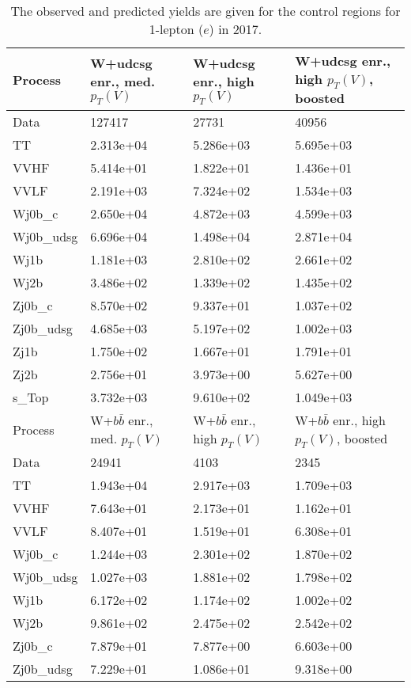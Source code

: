 \begin{table}
\centering
\caption[2017 1-lepton ($e$) control region yields]{
                  The observed and predicted yields are given for the
                  control regions for 1-lepton ($e$) in 2017.
                  }
{\footnotesize
\begin{tabularx}{0.8\textwidth}{|X|X|X|X|}
\hline
Process & W+udcsg enr., med. $p_{T}(V)$ & W+udcsg enr., high $p_{T}(V)$ & W+udcsg enr., high $p_{T}(V)$, boosted \\
\hline
Data & 127417 & 27731 & 40956 \\
\hline
TT & 2.313e+04 & 5.286e+03 & 5.695e+03 \\
VVHF & 5.414e+01 & 1.822e+01 & 1.436e+01 \\
VVLF & 2.191e+03 & 7.324e+02 & 1.534e+03 \\
Wj0b\_c & 2.650e+04 & 4.872e+03 & 4.599e+03 \\
Wj0b\_udsg & 6.696e+04 & 1.498e+04 & 2.871e+04 \\
Wj1b & 1.181e+03 & 2.810e+02 & 2.661e+02 \\
Wj2b & 3.486e+02 & 1.339e+02 & 1.435e+02 \\
Zj0b\_c & 8.570e+02 & 9.337e+01 & 1.037e+02 \\
Zj0b\_udsg & 4.685e+03 & 5.197e+02 & 1.002e+03 \\
Zj1b & 1.750e+02 & 1.667e+01 & 1.791e+01 \\
Zj2b & 2.756e+01 & 3.973e+00 & 5.627e+00 \\
s\_Top & 3.732e+03 & 9.610e+02 & 1.049e+03 \\
\hline
\hline
Process & W+$b\bar{b}$ enr., med. $p_{T}(V)$ & W+$b\bar{b}$ enr., high $p_{T}(V)$ & W+$b\bar{b}$ enr., high $p_{T}(V)$, boosted \\
\hline
Data & 24941 & 4103 & 2345 \\
\hline
TT & 1.943e+04 & 2.917e+03 & 1.709e+03 \\
VVHF & 7.643e+01 & 2.173e+01 & 1.162e+01 \\
VVLF & 8.407e+01 & 1.519e+01 & 6.308e+01 \\
Wj0b\_c & 1.244e+03 & 2.301e+02 & 1.870e+02 \\
Wj0b\_udsg & 1.027e+03 & 1.881e+02 & 1.798e+02 \\
Wj1b & 6.172e+02 & 1.174e+02 & 1.002e+02 \\
Wj2b & 9.861e+02 & 2.475e+02 & 2.542e+02 \\
Zj0b\_c & 7.879e+01 & 7.877e+00 & 6.603e+00 \\
Zj0b\_udsg & 7.229e+01 & 1.086e+01 & 9.318e+00 \\

\end{tabularx}}
\end{table}
